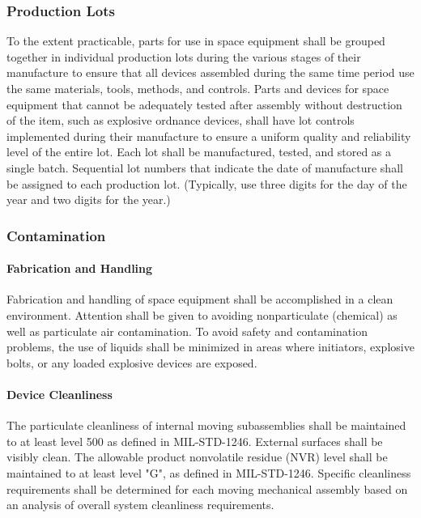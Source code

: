 \documentclass[12pt]{article}
\begin{document}
\subsubsection{Production Lots} %
To the extent practicable, parts for use in space equipment shall be grouped together in individual production lots during the various stages of their manufacture to ensure that all devices assembled during the same time period use the same materials, tools, methods, and controls. 
Parts and devices for space equipment that cannot be adequately tested after assembly without destruction of the item, such as explosive ordnance devices, shall have lot controls implemented during their manufacture to ensure a uniform quality and reliability level of the entire lot. 
Each lot shall be manufactured, tested, and stored as a single batch. 
Sequential lot numbers that indicate the date of manufacture shall be assigned to each production lot.
(Typically, use three digits for the day of the year and two digits for the year.)

\subsubsection{Contamination} %
\paragraph{Fabrication and Handling} %
Fabrication and handling of space equipment shall be accomplished in a clean environment. 
Attention shall be given to avoiding nonparticulate (chemical) as well as particulate air contamination. 
To avoid safety and contamination problems, the use of liquids shall be minimized in areas where initiators, explosive bolts, or any loaded explosive devices are exposed.

\paragraph{Device Cleanliness} %
The particulate cleanliness of internal moving subassemblies shall be maintained to at least level 500 as defined in MIL-STD-1246. 
External surfaces shall be visibly clean. 
The allowable product nonvolatile residue (NVR) level shall be maintained to at least level "G", as defined in MIL-STD-1246. 
Specific cleanliness requirements shall be determined for each moving mechanical assembly based on an analysis of overall system cleanliness requirements.
\end{document}
